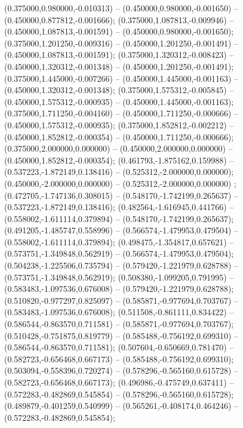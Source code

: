  (0.375000,0.980000,-0.010313) -- (0.450000,0.980000,-0.001650) -- (0.450000,0.877812,-0.001666);
 (0.375000,1.087813,-0.009946) -- (0.450000,1.087813,-0.001591) -- (0.450000,0.980000,-0.001650);
 (0.375000,1.201250,-0.009316) -- (0.450000,1.201250,-0.001491) -- (0.450000,1.087813,-0.001591);
 (0.375000,1.320312,-0.008423) -- (0.450000,1.320312,-0.001348) -- (0.450000,1.201250,-0.001491);
 (0.375000,1.445000,-0.007266) -- (0.450000,1.445000,-0.001163) -- (0.450000,1.320312,-0.001348);
 (0.375000,1.575312,-0.005845) -- (0.450000,1.575312,-0.000935) -- (0.450000,1.445000,-0.001163);
 (0.375000,1.711250,-0.004160) -- (0.450000,1.711250,-0.000666) -- (0.450000,1.575312,-0.000935);
 (0.375000,1.852812,-0.002212) -- (0.450000,1.852812,-0.000354) -- (0.450000,1.711250,-0.000666);
 (0.375000,2.000000,0.000000) -- (0.450000,2.000000,0.000000) -- (0.450000,1.852812,-0.000354);
 (0.461793,-1.875162,0.159988) -- (0.537223,-1.872149,0.138416) -- (0.525312,-2.000000,0.000000);
 (0.450000,-2.000000,0.000000) -- (0.525312,-2.000000,0.000000) ;
 (0.472705,-1.747136,0.308015) -- (0.548170,-1.742199,0.265637) -- (0.537223,-1.872149,0.138416);
 (0.482564,-1.616945,0.441766) -- (0.558002,-1.611114,0.379894) -- (0.548170,-1.742199,0.265637);
 (0.491205,-1.485747,0.558996) -- (0.566574,-1.479953,0.479504) -- (0.558002,-1.611114,0.379894);
 (0.498475,-1.354817,0.657621) -- (0.573751,-1.349848,0.562919) -- (0.566574,-1.479953,0.479504);
 (0.504238,-1.225506,0.735794) -- (0.579420,-1.221979,0.628788) -- (0.573751,-1.349848,0.562919);
 (0.508380,-1.099205,0.791995) -- (0.583483,-1.097536,0.676008) -- (0.579420,-1.221979,0.628788);
 (0.510820,-0.977297,0.825097) -- (0.585871,-0.977694,0.703767) -- (0.583483,-1.097536,0.676008);
 (0.511508,-0.861111,0.834422) -- (0.586544,-0.863570,0.711581) -- (0.585871,-0.977694,0.703767);
 (0.510428,-0.751875,0.819779) -- (0.585488,-0.756192,0.699310) -- (0.586544,-0.863570,0.711581);
 (0.507604,-0.650669,0.781470) -- (0.582723,-0.656468,0.667173) -- (0.585488,-0.756192,0.699310);
 (0.503094,-0.558396,0.720274) -- (0.578296,-0.565160,0.615728) -- (0.582723,-0.656468,0.667173);
 (0.496986,-0.475749,0.637411) -- (0.572283,-0.482869,0.545854) -- (0.578296,-0.565160,0.615728);
 (0.489879,-0.401259,0.540999) -- (0.565261,-0.408174,0.464246) -- (0.572283,-0.482869,0.545854);
